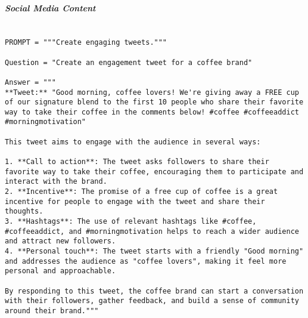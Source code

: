 \subparagraph{Social Media Content} \mbox{} 

\begin{tcolorbox}[title={\textbf{\small Performance Before Optimization}}, boxrule=2pt, arc=0mm, breakable]
\begin{verbatim}

PROMPT = """Create engaging tweets."""

Question = "Create an engagement tweet for a coffee brand"

Answer = """
**Tweet:** "Good morning, coffee lovers! We're giving away a FREE cup of our signature blend to the first 10 people who share their favorite way to take their coffee in the comments below! #coffee #coffeeaddict #morningmotivation"

This tweet aims to engage with the audience in several ways:

1. **Call to action**: The tweet asks followers to share their favorite way to take their coffee, encouraging them to participate and interact with the brand.
2. **Incentive**: The promise of a free cup of coffee is a great incentive for people to engage with the tweet and share their thoughts.
3. **Hashtags**: The use of relevant hashtags like #coffee, #coffeeaddict, and #morningmotivation helps to reach a wider audience and attract new followers.
4. **Personal touch**: The tweet starts with a friendly "Good morning" and addresses the audience as "coffee lovers", making it feel more personal and approachable.

By responding to this tweet, the coffee brand can start a conversation with their followers, gather feedback, and build a sense of community around their brand."""


\end{verbatim}
\end{tcolorbox}

